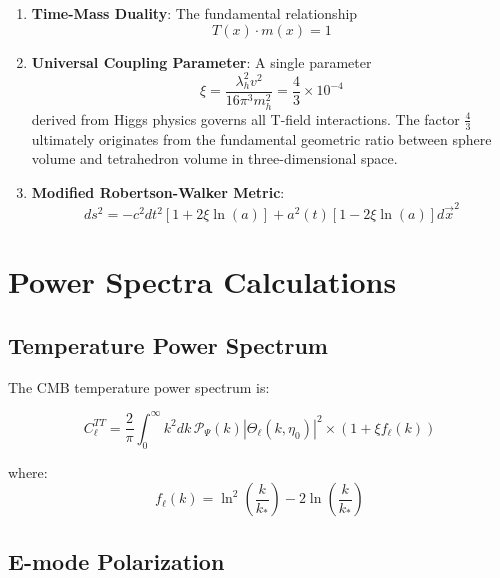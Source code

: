 \documentclass[12pt,a4paper]{article}
\newcommand{\Tfield}{T(x)}
\newcommand{\xipar}{\xi}
\theoremstyle{definition}
\theoremstyle{remark}
\begin{document}
	\begin{enumerate}
		\item \textbf{Time-Mass Duality}: The fundamental relationship
		\begin{equation}
			\Tfield \cdot m(x) = 1
			\label{eq:time_mass_duality}
		\end{equation}
		
		\item \textbf{Universal Coupling Parameter}: A single parameter
		\begin{equation}
			\xipar = \frac{\lambda_h^2 v^2}{16\pi^3 m_h^2} = \frac{4}{3} \times 10^{-4}
			\label{eq:xi_definition}
		\end{equation}
		derived from Higgs physics governs all T-field interactions. The factor $\frac{4}{3}$ ultimately originates from the fundamental geometric ratio between sphere volume and tetrahedron volume in three-dimensional space.
		
		\item \textbf{Modified Robertson-Walker Metric}:
		\begin{equation}
			ds^2 = -c^2dt^2[1 + 2\xipar\ln(a)] + a^2(t)[1 - 2\xipar\ln(a)]d\vec{x}^2
			\label{eq:modified_metric}
		\end{equation}
	\end{enumerate}
	
	\section{Power Spectra Calculations}
	\label{sec:power_spectra}
	
	\subsection{Temperature Power Spectrum}
	
	The CMB temperature power spectrum is:
	
	\begin{equation}
		C_\ell^{TT} = \frac{2}{\pi}\int_0^\infty k^2 dk \, \mathcal{P}_\Psi(k) |\Theta_\ell(k,\eta_0)|^2 \times \left(1 + \xipar f_\ell(k)\right)
		\label{eq:cl_tt}
	\end{equation}
	
	where:
	\begin{equation}
		f_\ell(k) = \ln^2\left(\frac{k}{k_*}\right) - 2\ln\left(\frac{k}{k_*}\right)
	\end{equation}
	
	\subsection{E-mode Polarization}
	
\end{document}
